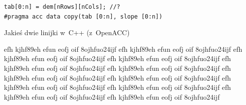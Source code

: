 \documentclass[a4paper,12pt]{book} %
\begin{document}
\begin{lstfloat}[b]
\lstset{language=C++}
\begin{lstlisting}[frame=single]
tab[0:n] = dem[nRows][nCols]; //?
#pragma acc data copy(tab [0:n], slope [0:n])
\end{lstlisting}
\caption{Jakieś dwie linijki w~C++ (z~OpenACC)}\label{lst:przyk}
\end{lstfloat}

efh kjhf89eh efun eofj oif 8ojhfuo24ijf
efh kjhf89eh efun eofj oif 8ojhfuo24ijf
efh kjhf89eh efun eofj oif 8ojhfuo24ijf
efh kjhf89eh efun eofj oif 8ojhfuo24ijf
efh kjhf89eh efun eofj oif 8ojhfuo24ijf
efh kjhf89eh efun eofj oif 8ojhfuo24ijf
efh kjhf89eh efun eofj oif 8ojhfuo24ijf
efh kjhf89eh efun eofj oif 8ojhfuo24ijf
efh kjhf89eh efun eofj oif 8ojhfuo24ijf
efh kjhf89eh efun eofj oif 8ojhfuo24ijf
efh kjhf89eh efun eofj oif 8ojhfuo24ijf
efh kjhf89eh efun eofj oif 8ojhfuo24ijf
\end{document}
